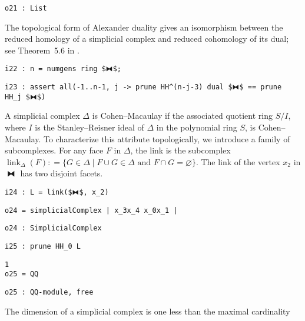 \documentclass[12pt,leqno]{amsart}
\theoremstyle{definition}
\newcommand{\colequal}{\ensuremath{:\!=}}
\begin{document}
\begin{lstlisting}[xleftmargin=10pt, aboveskip=1pt, belowskip=3pt]
o21 : List
\end{lstlisting}
The topological form of Alexander duality gives an isomorphism
between the reduced homology of a simplicial complex and reduced cohomology of
its dual; see Theorem~5.6 in \cite{MS}.
\begin{lstlisting}[xleftmargin=10pt, aboveskip=3pt, belowskip=1.5pt]
i22 : n = numgens ring $⧓$;
\end{lstlisting}
\begin{lstlisting}[xleftmargin=10pt, aboveskip=1pt, belowskip=3pt]
i23 : assert all(-1..n-1, j -> prune HH^(n-j-3) dual $⧓$ == prune HH_j $⧓$)
\end{lstlisting}

A simplicial complex $\Delta$ is Cohen--Macaulay if the associated quotient
ring $S/I$, where $I$ is the Stanley--Reisner ideal of $\Delta$ in the
polynomial ring $S$, is Cohen--Macaulay.  To characterize this attribute
topologically, we introduce a family of subcomplexes.  For any face $F$ in
$\Delta$, the link is the subcomplex
$\operatorname{link}_\Delta(F) \colequal \{ G \in \Delta \mathrel{|}
\text{$F \cup G \in \Delta$ and $F \cap G = \varnothing$} \}$.  The link of
the vertex $x_2$ in $⧓$ has two disjoint facets.
\begin{lstlisting}[xleftmargin=10pt, aboveskip=3.0pt, belowskip=1.5pt]
i24 : L = link($⧓$, x_2)
\end{lstlisting}
\begin{lstlisting}[xleftmargin=10pt, aboveskip=1.5pt, belowskip=1.5pt]
o24 = simplicialComplex | x_3x_4 x_0x_1 |
\end{lstlisting}
\begin{lstlisting}[xleftmargin=10pt, aboveskip=1.5pt, belowskip=1.5pt]
o24 : SimplicialComplex
\end{lstlisting}
\begin{lstlisting}[xleftmargin=10pt, aboveskip=1.5pt, belowskip=1.5pt]
i25 : prune HH_0 L
\end{lstlisting}
\begin{lstlisting}[xleftmargin=10pt, lineskip=-10pt, aboveskip=4pt, belowskip=1pt]
        1
o25 = QQ
\end{lstlisting}
\begin{lstlisting}[xleftmargin=10pt, aboveskip=1.5pt, belowskip=3.0pt]
o25 : QQ-module, free
\end{lstlisting}
The dimension of a simplicial complex is one less than the maximal cardinality
\end{document}
